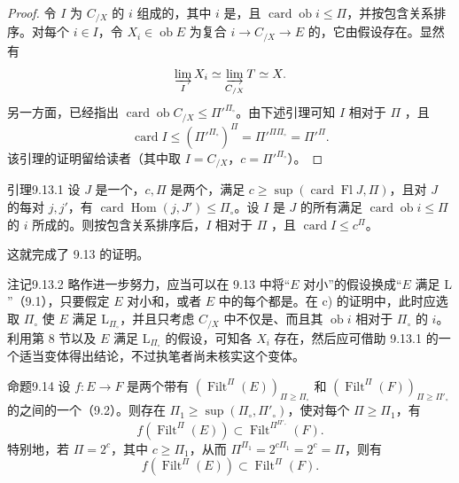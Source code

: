 \begin{proof}
令 $I$ 为 $C_{/X}$ 的 $i$ 组成的，其中 $i$ 是，且 $\operatorname{card}\operatorname{ob}i\leq\Pi$，并按包含关系排序。对每个 $i\in I$，令 $X_i\in\operatorname{ob}E$ 为复合 $i\to C_{/X}\to E$ 的，它由假设存在。显然有
\[
\varinjlim_I X_i\simeq\varinjlim_{C_{/X}}T\simeq X.
\]
另一方面，已经指出 $\operatorname{card}\operatorname{ob}C_{/X}\leq\Pi'^{\Pi_\circ}$。由下述引理可知 $I$ 相对于 $\Pi$ ，且
\[
\operatorname{card}I\leq(\Pi'^{\Pi_\circ})^\Pi
=\Pi'^{\Pi\Pi_\circ}=\Pi'^\Pi.
\]
该引理的证明留给读者（其中取 $I=C_{/X}$，$c=\Pi'^{\Pi_\circ}$）。
\end{proof}

\begin{SGAresult}{引理}{9.13.1}
设 $J$ 是一个，$c,\Pi$ 是两个，满足 $c\geq\sup(\operatorname{card}\operatorname{Fl}J,\Pi)$，且对 $J$ 的每对 $j,j'$，有 $\operatorname{card}\operatorname{Hom}(j,J')\leq\Pi_\circ$。设 $I$ 是 $J$ 的所有满足 $\operatorname{card}\operatorname{ob}i\leq\Pi$ 的 $i$ 所成的。则按包含关系排序后，$I$ 相对于 $\Pi$ ，且 $\operatorname{card}I\leq c^\Pi$。
\end{SGAresult}

这就完成了 9.13 的证明。

\begin{SGAresult}{注记}{9.13.2}
略作进一步努力，应当可以在 9.13 中将“$E$ 对小”的假设换成“$E$ 满足 $\mathrm L$”（9.1），只要假定 $E$ 对小和，或者 $E$ 中的每个都是。在 c) 的证明中，此时应选取 $\Pi_\circ$ 使 $E$ 满足 $\mathrm L_{\Pi_\circ}$，并且只考虑 $C_{/X}$ 中不仅是、而且其 $\operatorname{ob}i$ 相对于 $\Pi_\circ$  的 $i$。利用第 8 节以及 $E$ 满足 $\mathrm L_{\Pi_\circ}$ 的假设，可知各 $X_i$ 存在，然后应可借助 9.13.1 的一个适当变体得出结论，不过执笔者尚未核实这个变体。
\end{SGAresult}

\begin{SGAresult}{命题}{9.14}
设 $f:E\to F$ 是两个带有 $(\operatorname{Filt}^\Pi(E))_{\Pi\geq\Pi_\circ}$ 和 $(\operatorname{Filt}^\Pi(F))_{\Pi\geq\Pi'_\circ}$ 的之间的一个（9.2）。则存在 $\Pi_1\geq\sup(\Pi_\circ,\Pi'_\circ)$，使对每个 $\Pi\geq\Pi_1$，有
\[
f(\operatorname{Filt}^\Pi(E))\subset\operatorname{Filt}^{\Pi^{\Pi'_\circ}}(F).\tag{9.14.1}
\]
特别地，若 $\Pi=2^c$，其中 $c\geq\Pi_1$，从而 $\Pi^{\Pi_1}=2^{c\Pi_1}=2^c=\Pi$，则有
\[
f(\operatorname{Filt}^\Pi(E))\subset\operatorname{Filt}^\Pi(F).\tag{9.14.2}
\]
\end{SGAresult}

